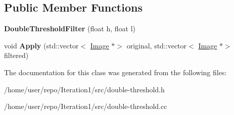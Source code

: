 \subsection*{Public Member Functions}
\begin{DoxyCompactItemize}
\item 
\mbox{\label{classDoubleThresholdFilter_a913781178b551ee558833d1ef207837f}} 
{\bfseries Double\+Threshold\+Filter} (float h, float l)
\item 
\mbox{\label{classDoubleThresholdFilter_aaf926813c03a95d5945625d60a811a3c}} 
void {\bfseries Apply} (std\+::vector$<$ \hyperlink{classImage}{Image} $\ast$$>$ original, std\+::vector$<$ \hyperlink{classImage}{Image} $\ast$$>$ filtered)
\end{DoxyCompactItemize}


The documentation for this class was generated from the following files\+:\begin{DoxyCompactItemize}
\item 
/home/user/repo/\+Iteration1/src/double-\/threshold.\+h\item 
/home/user/repo/\+Iteration1/src/double-\/threshold.\+cc\end{DoxyCompactItemize}
